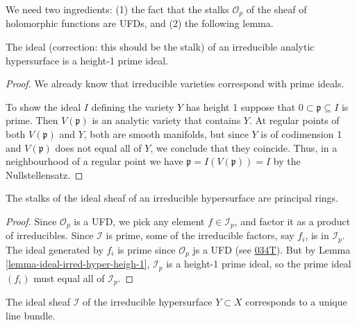 We need two ingredients:
(1) the fact that the stalks $\mathcal{O}_p$
of the
sheaf of holomorphic functions are UFDs,
and (2) the following lemma.

\begin{lemma}
\label{lemma-ideal-irred-hyper-heigh-1}
The ideal
(correction: this should be the stalk)
of an irreducible analytic hypersurface is a
height-1 prime ideal.
\end{lemma}

\begin{proof}
We already know that irreducible varieties
correspond with prime ideals.

To show the ideal $I$ defining the variety
$Y$ has height 1
suppose that $0 \subset \mathfrak{p}
\subseteq I$ is prime.
Then $V(\mathfrak{p})$ is an analytic variety
that contains $Y$.
At regular points of both $V(\mathfrak{p})$
and $Y$,
both are smooth manifolds, but since $Y$ is
of codimension 1 and
$V(\mathfrak{p})$ does not equal all of  $Y$,
we conclude that they coincide.
Thus, in a neighbourhood
of a regular point we have
$\mathfrak{p}=I(V(\mathfrak{p}))=I$ by the
Nullstellensatz.
\end{proof}

\begin{lemma}
\label{lemma-stalk-ideal-sheaf-princ-hyper}
The stalks of the ideal sheaf of
an irreducible hypersurface
are principal rings.
\end{lemma}

\begin{proof}
Since $\mathcal{O}_p$
is a UFD, we pick any element
$f \in \mathcal{I}_p$, and factor it as a
product of irreducibles.
Since $\mathcal{I}$ is prime, some of the
irreducible factors,
say $f_i$, is in $\mathcal{I}_p$.
The ideal generated by $f_i$ is prime since
$\mathcal{O}_p$
js a UFD (see
\href{https://stacks.math.columbia.edu/tag/%
034T}{034T}).
But by Lemma
\ref{lemma-ideal-irred-hyper-heigh-1},
$\mathcal{I}_p$ is a height-1 prime ideal, so
the prime ideal $(f_i)$
must equal all of $\mathcal{I}_p$.
\end{proof}

\begin{lemma}
\label{lemma-ideal-sheaf-irred-hyper-line}
The ideal sheaf $\mathcal{I}$
of the irreducible hypersurface $Y \subset X$
corresponds to a unique line bundle.
\end{lemma}


